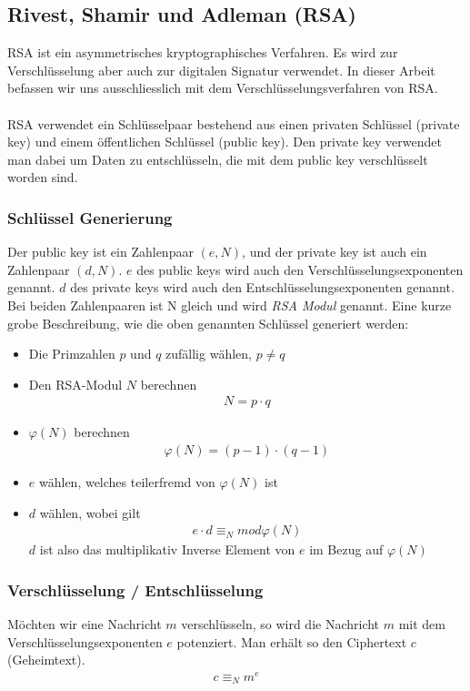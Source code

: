 \documentclass[paper=a4,fontsize=12pt]{scrartcl}
\begin{document}
\subsection{Rivest, Shamir und Adleman (RSA)} \label{RSA-intro}
RSA ist ein asymmetrisches kryptographisches Verfahren. Es wird zur Verschlüsselung aber auch zur digitalen Signatur verwendet.
In dieser Arbeit befassen wir uns ausschliesslich mit dem Verschlüsselungsverfahren von RSA.
\\ \\
RSA verwendet ein Schlüsselpaar bestehend aus einen privaten Schlüssel (private key) und einem öffentlichen Schlüssel  (public key).
Den private key verwendet man dabei um Daten zu entschlüsseln, die mit dem public key verschlüsselt worden sind. 

\subsubsection{Schlüssel Generierung}
Der public key ist ein Zahlenpaar $(e,N)$, und der private key ist auch ein Zahlenpaar $(d,N)$.
$e$ des public keys wird auch den Verschlüsselungsexponenten genannt.
$d$ des private keys wird auch den Entschlüsselungsexponenten genannt. 
Bei beiden Zahlenpaaren ist N gleich und wird \textit{RSA Modul} genannt.
Eine kurze grobe Beschreibung, wie die oben genannten Schlüssel generiert werden:
\begin{itemize}
  \item Die Primzahlen $p$ und $q$ zufällig wählen, $p \neq q$
  \item Den RSA-Modul $N$ berechnen \begin{align} N = p \cdot q \end{align}
  \item $\varphi(N)$ berechnen \begin{align} \varphi(N) = (p-1) \cdot (q-1)\end{align}
  \item $e$ wählen, welches teilerfremd von $\varphi(N)$ ist
  \item $d$ wählen, wobei gilt \begin{align} e \cdot d \equiv_N mod \varphi(N)\end{align} $d$ ist also das multiplikativ Inverse Element von $e$ im Bezug auf $\varphi(N)$
\end{itemize}

\subsubsection{Verschlüsselung / Entschlüsselung}
Möchten wir eine Nachricht $m$ verschlüsseln, so wird die Nachricht $m$ mit dem Verschlüsselungsexponenten $e$ potenziert.
Man erhält so den Ciphertext $c$ (Geheimtext).
\begin{align}
	c \equiv_N m^e
\end{align}
\end{document}

